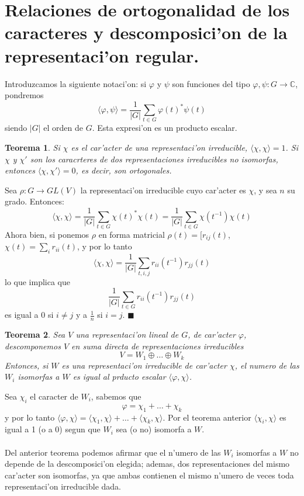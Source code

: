 \documentclass[a4paper,openright,12pt]{book}
\numberwithin{equation}{section} %
\newtheorem{teorema}{Teorema}[section] %
\newenvironment{proof}{\noindent{\it Demostracion:}}{\hfill$\blacksquare$} %
\begin{document}
\section{Relaciones de ortogonalidad de los caracteres y descomposici'on de la representaci'on regular.}
Introduzcamos la siguiente notaci'on: si $\varphi$ y $\psi$ son funciones del tipo $\varphi , \psi : G \rightarrow \mathbb{C}$, pondremos
\[
\langle \varphi , \psi \rangle = \frac{1}{|G|}\sum_{t \in G} \varphi (t)^{*} \psi (t)
\]
siendo $|G|$ el orden de $G$. Esta expresi'on es un producto escalar.
\begin{teorema}
Si $\chi$ es el car'acter de una representaci'on irreducible, $\langle \chi , \chi \rangle =1$. Si $\chi$ y $\chi'$ son los caracrteres de dos representaciones irreducibles no isomorfas, entonces $\langle \chi , \chi' \rangle=0$, es decir, son ortogonales.
\end{teorema}
\begin{proof}
Sea $\rho: G \rightarrow GL(V)$ la representaci'on irreducible cuyo car'acter es $\chi$, y sea $n$ su grado. Entonces:
\[
\langle \chi , \chi \rangle = \frac{1}{|G|}\sum_{t \in G} \chi (t)^{*} \chi (t)  = \frac{1}{|G|}\sum_{t \in G} \chi (t^{-1}) \chi (t) 
\]
Ahora bien, si ponemos $\rho$ en forma matricial $\rho(t)=[r_{ij}(t)$, $\chi (t) = \sum_{i} r_{ii}(t)$, y por lo tanto
\[
\langle \chi , \chi \rangle = \frac{1}{|G|}\sum_{t, i, j} r_{ii} (t^{-1}) r_{jj} (t) 
\]
lo que implica que
\[
\frac{1}{|G|}\sum_{t \in G} r_{ii} (t^{-1}) r_{jj} (t)
\]
es igual a 0 si $i \neq j$ y a $\frac{1}{n}$ si $i=j$.
\end{proof}
\begin{teorema}
Sea $V$ una representaci'on lineal de $G$, de car'acter $\varphi$, descomponemos $V$ en suma directa de representaciones irreducibles
\[
V = W_{1} \oplus \ldots \oplus W_{k}
\]
Entonces, si $W$ es una representaci'on irreducible de car'acter $\chi$, el numero de las $W_{i}$ isomorfas a $W$ es igual al prducto escalar $\langle \varphi , \chi \rangle$. 
\end{teorema}
Sea $\chi_{i}$ el caracter de $W_{i}$, sabemos que 
\[
\varphi = \chi_{1}+ \ldots + \chi_{k}
\]
y por lo tanto $\langle \varphi , \chi \rangle= \langle \chi_{1}, \chi \rangle +\ldots +   \langle \chi_{k}, \chi \rangle $. Por el teorema anterior $\langle \chi_{i}, \chi \rangle$ es igual a 1 (o a 0) segun que $W_{i}$ sea (o no) isomorfa a $W$.\\
\\
Del anterior teorema podemos afirmar que el n'umero de las $W_{i}$ isomorfas a $W$ no depende de la descomposici'on elegida; ademas, dos representaciones del mismo car'acter son isomorfas, ya que ambas contienen el mismo n'umero de veces toda representaci'on irreducible dada.\\
\end{document}
